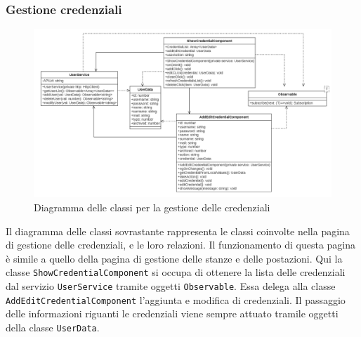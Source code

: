 \subsubsection{Gestione credenziali}
\begin{figure}[H]
	\centering
	\includegraphics[width=18cm]{res/images/webapp-credenziali-diagrammaClassi.png}
	\caption{Diagramma delle classi per la gestione delle credenziali}
	\label{fig:DiagrammaClassiCredenziali}
\end{figure}
Il diagramma delle classi sovrastante rappresenta le classi coinvolte nella pagina di gestione delle credenziali, e le loro relazioni. Il funzionamento di questa pagina è simile a quello della pagina di gestione delle stanze e delle postazioni. Qui la classe \texttt{ShowCredentialComponent} si occupa di ottenere la lista delle credenziali dal servizio \texttt{UserService} tramite oggetti \texttt{Observable}. Essa delega alla classe \texttt{AddEditCredentialComponent} l'aggiunta e modifica di credenziali. Il passaggio delle informazioni riguanti le credenziali viene sempre attuato tramile oggetti della classe \texttt{UserData}.

